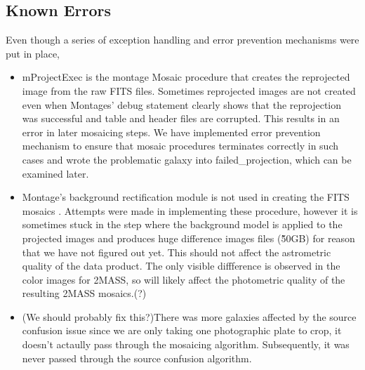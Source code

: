 \documentclass[5p]{elsarticle}
\begin{document}
	\subsection{Known Errors}
	Even though a series of exception handling and error prevention mechanisms were put in place, 
	 	\begin{itemize}
	 		\item mProjectExec is the montage Mosaic procedure that creates the reprojected image from the raw FITS files. Sometimes reprojected images are not created even when Montages' debug statement clearly shows that the reprojection was successful and table and header files are corrupted. This results in an error in later mosaicing steps. We have implemented error prevention mechanism to ensure that mosaic procedures terminates correctly in such cases and wrote the problematic galaxy into failed\_projection, which can be examined later.
	 		\item Montage's background rectification module is not used in creating the FITS mosaics . Attempts were made in implementing these procedure, however it  is sometimes stuck in the step where the background model is applied to the projected images and  produces huge difference images files (\~50GB) for reason that we have not figured out yet. This should not affect the astrometric quality of the data product. The only visible diffference is observed in the color images for 2MASS, so will likely affect the photometric quality of the resulting 2MASS mosaics.(?)
	 	  \item (We should probably fix this?)There was more galaxies affected by the source confusion issue since we are only taking one photographic plate to crop, it doesn't actaully pass through the mosaicing algorithm. Subsequently,  it was never passed through the source confusion algorithm. 
	 	\end{itemize}
	
\end{document}
